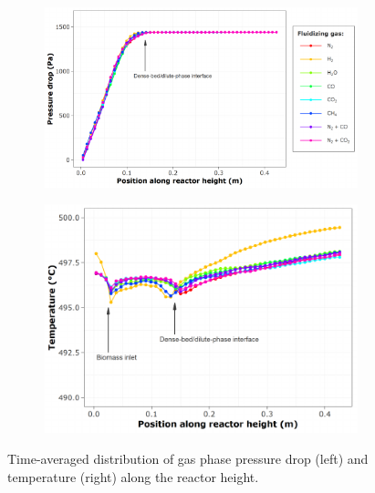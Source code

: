 \begin{figure}[H]
    \begin{subfigure}{0.55\textwidth}
        \includegraphics[width=\textwidth]{figures/cfd-pressure.pdf}
    \end{subfigure}
    \begin{subfigure}{0.45\textwidth}
        \includegraphics[width=\textwidth]{figures/cfd-temperature.pdf}
    \end{subfigure}
    \caption{Time-averaged distribution of gas phase pressure drop (left) and temperature (right) along the reactor height.}
    \label{fig:cfd-press-temp}
\end{figure}


